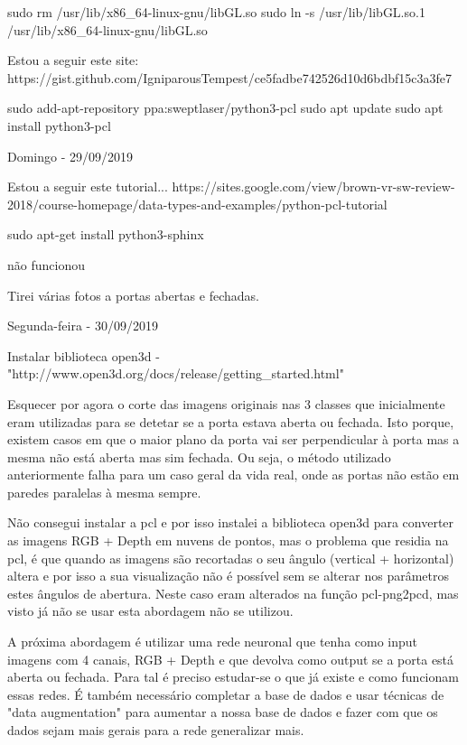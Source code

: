             sudo rm /usr/lib/x86\_64-linux-gnu/libGL.so
            sudo ln -s /usr/lib/libGL.so.1 /usr/lib/x86\_64-linux-gnu/libGL.so
            
            Estou a seguir este site:
            https://gist.github.com/IgniparousTempest/ce5fadbe742526d10d6bdbf15c3a3fe7
            
            
            
            sudo add-apt-repository ppa:sweptlaser/python3-pcl
            sudo apt update
            sudo apt install python3-pcl
        
        
        \bigskip
        
        Domingo - 29/09/2019
        
        Estou a seguir este tutorial... 
        https://sites.google.com/view/brown-vr-sw-review-2018/course-homepage/data-types-and-examples/python-pcl-tutorial
        
        sudo apt-get install python3-sphinx
        
        não funcionou
        
        Tirei várias fotos a portas abertas e fechadas.
        

        
        \bigskip
        
        Segunda-feira - 30/09/2019
        
        Instalar biblioteca open3d - "http://www.open3d.org/docs/release/getting\_started.html"
        
        Esquecer por agora o corte das imagens originais nas 3 classes que inicialmente eram utilizadas para se detetar se a porta estava aberta ou fechada. Isto porque, existem casos em que o maior plano da porta vai ser perpendicular à porta mas a mesma não está aberta mas sim fechada. Ou seja, o método utilizado anteriormente falha para um caso geral da vida real, onde as portas não estão em paredes paralelas à mesma sempre.
        
        Não consegui instalar a pcl e por isso instalei a biblioteca open3d para converter as imagens RGB + Depth em nuvens de pontos, mas o problema que residia na pcl, é que quando as imagens são recortadas o seu ângulo (vertical + horizontal) altera e por isso a sua visualização não é possível sem se alterar nos parâmetros estes ângulos de abertura. Neste caso eram alterados na função pcl-png2pcd, mas visto já não se usar esta abordagem não se utilizou.
        
        A próxima abordagem é utilizar uma rede neuronal que tenha como input imagens com 4 canais, RGB + Depth e que devolva como output se a porta está aberta ou fechada. Para tal é preciso estudar-se o que já existe e como funcionam essas redes. É também necessário completar a base de dados e usar técnicas de "data augmentation" para aumentar a nossa base de dados e fazer com que os dados sejam mais gerais para a rede generalizar mais.
        
